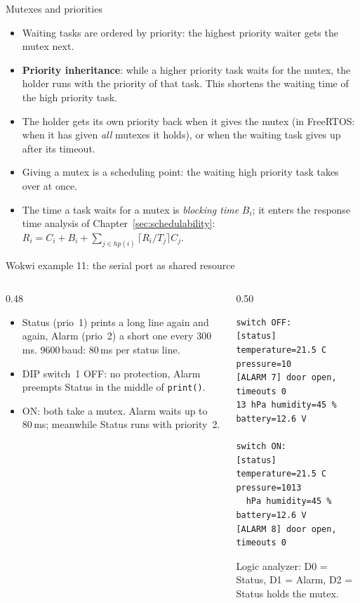 \begin{frame}{Mutexes and priorities}
  \begin{itemize}
    \item Waiting tasks are ordered by priority: the highest priority waiter gets the mutex next.
    \item \textbf{Priority inheritance}: while a higher priority task waits for the mutex, the holder runs with the priority of that task. This shortens the waiting time of the high priority task.
    \item The holder gets its own priority back when it gives the mutex (in FreeRTOS: when it has given \emph{all} mutexes it holds), or when the waiting task gives up after its timeout.
    \item Giving a mutex is a scheduling point: the waiting high priority task takes over at once.
    \item The time a task waits for a mutex is \emph{blocking time} $B_i$; it enters the response time analysis of Chapter~\ref{sec:schedulability}: $R_i = C_i + B_i + \sum_{j \in hp(i)} \lceil R_i / T_j \rceil C_j$.
  \end{itemize}
\end{frame}

\begin{frame}[fragile]{Wokwi example 11: the serial port as shared resource}
  \begin{columns}[T]
    \begin{column}{0.48\textwidth}
      \small
      \begin{itemize}
        \item Status (prio~1) prints a long line again and again, Alarm (prio~2) a short one every 300\,ms. 9600\,baud: 80\,ms per status line.
        \item DIP switch~1 OFF: no protection, Alarm preempts Status in the middle of \texttt{print()}.
        \item ON: both take a mutex. Alarm waits up to 80\,ms; meanwhile Status runs with priority~2.
      \end{itemize}
    \end{column}
    \begin{column}{0.50\textwidth}
      \scriptsize
\begin{verbatim}
switch OFF:
[status] temperature=21.5 C pressure=10
[ALARM 7] door open, timeouts 0
13 hPa humidity=45 % battery=12.6 V

switch ON:
[status] temperature=21.5 C pressure=1013
  hPa humidity=45 % battery=12.6 V
[ALARM 8] door open, timeouts 0
\end{verbatim}
      \small Logic analyzer: D0 = Status, D1 = Alarm, D2 = Status holds the mutex.
    \end{column}
  \end{columns}
\end{frame}

